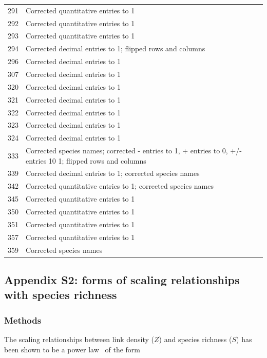 \documentclass[12pt]{article}
\begin{document}
\begin{center}
\begin{table}
{\begin{tabular}{l | p{13cm}}
      291 &  Corrected quantitative entries to 1 \\
      292 &  Corrected quantitative entries to 1 \\
      293 &  Corrected quantitative entries to 1 \\
      294 &  Corrected decimal entries to 1; flipped rows and columns \\
      296 &  Corrected decimal entries to 1 \\
      307 &  Corrected decimal entries to 1 \\
      320 &  Corrected decimal entries to 1 \\
      321 &  Corrected decimal entries to 1 \\
      322 &  Corrected decimal entries to 1 \\
      323 &  Corrected decimal entries to 1 \\
      324 &  Corrected decimal entries to 1 \\
      333 &  Corrected species names; corrected - entries to 1, + entries to 0, +/- entries 10 1; flipped rows and columns \\
      339 &  Corrected decimal entries to 1; corrected species names \\
      342 &  Corrected quantitative entries to 1; corrected species names \\
      345 &  Corrected quantitative entries to 1 \\
      350 &  Corrected quantitative entries to 1 \\
      351 &  Corrected quantitative entries to 1 \\
      357 &  Corrected quantitative entries to 1 \\
      359 &  Corrected species names \\
      \hline
      \end{tabular} }
    \end{table}
  \end{center}
\clearpage


\subsection*{Appendix S2: forms of scaling relationships with species richness}

  \subsubsection*{Methods}

    The scaling relationships between link density ($Z$) and species richness ($S$)
    has been shown to be a power law~\cite{Riede2010} of the form 
\end{document}
